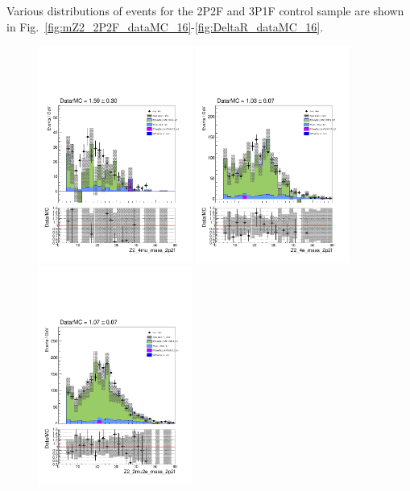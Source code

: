 Various distributions of events for the 2P2F and 3P1F control sample are shown in Fig.~\ref{fig:mZ2_2P2F_dataMC_16}-\ref{fig:DeltaR_dataMC_16}. 

\begin{figure}[!htb]
\begin{center}
    {\includegraphics [width=0.45\textwidth] {Figures/RedBkg/2P2F/Z2_4mu_mass_2p2f.pdf}}
    {\includegraphics [width=0.45\textwidth] {Figures/RedBkg/2P2F/Z2_4e_mass_2p2f.pdf}} \\
    {\includegraphics [width=0.45\textwidth] {Figures/RedBkg/2P2F/Z2_2mu2e_mass_2p2f.pdf}}

\end{center}
\end{figure}
